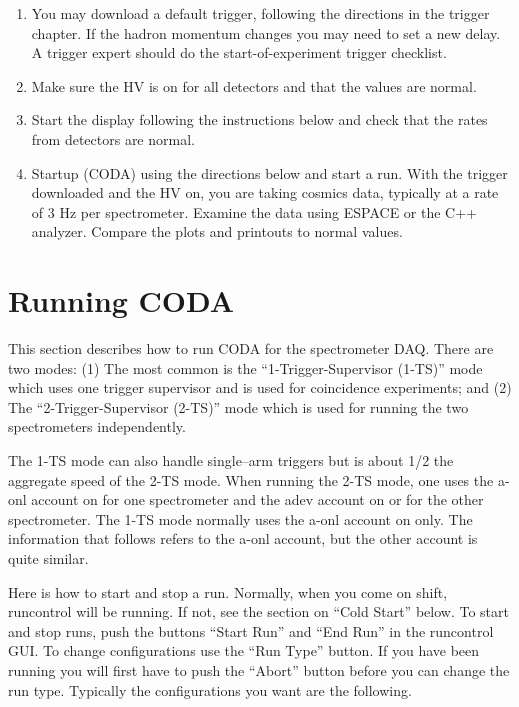 {\begin{enumerate}
\item{You may download
a default trigger, following the directions in
the trigger chapter.  If the hadron momentum changes
you may need to set a new delay.  A trigger expert
should do the start-of-experiment
trigger checklist.}

\item{Make sure the HV is on for all detectors
and that the values are normal.}

\item{Start the 
display following the instructions below and
check that the rates from detectors are normal.}
 
\item{Startup  (CODA) using the directions below
and start a run.  With the trigger downloaded
and the HV on, you are taking cosmics data, typically at 
a rate of 3 Hz per spectrometer.  
Examine the data using ESPACE or the C++ analyzer.
Compare the plots and printouts to normal values.}

\end{enumerate}

\section{Running CODA}

\par
This section describes how to run CODA for
the spectrometer DAQ.  There are two modes:
(1) The most common is the ``1-Trigger-Supervisor (1-TS)''
mode which uses one trigger supervisor and
is used for coincidence experiments; and
(2) The ``2-Trigger-Supervisor (2-TS)'' mode which
is used for running the two spectrometers
independently.

\par
The 1-TS mode can also handle single--arm
triggers but is about 1/2 the aggregate speed
of the 2-TS mode.  When running the 2-TS
mode, one uses the a-onl account on  for one
spectrometer and the adev account on  or  
for the other spectrometer.  
The 1-TS mode normally uses the 
a-onl account on  only.
The information that follows refers to 
the a-onl account, but the other account is quite similar.

\par
Here is how to start and stop a run.
Normally, when you come on shift, 
runcontrol will be running.  If not,
see the section on ``Cold Start'' below.
To start and stop runs, push the buttons
``Start Run'' and ``End Run'' in the
runcontrol GUI.   To change configurations
use the ``Run Type'' button.  If you have
been running you will first have to push the
``Abort'' button before you can change the 
run type. Typically the configurations
you want are the following.

}
